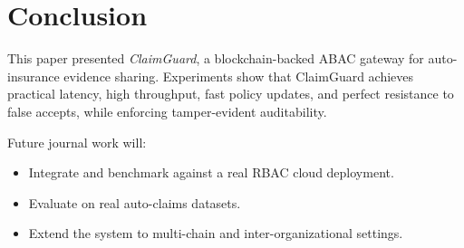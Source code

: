 \documentclass[conference]{IEEEtran}
\begin{document}
\section{Conclusion}

This paper presented \emph{ClaimGuard}, a blockchain-backed ABAC gateway for auto-insurance evidence sharing. Experiments show that ClaimGuard achieves practical latency, high throughput, fast policy updates, and perfect resistance to false accepts, while enforcing tamper-evident auditability.

Future journal work will:
\begin{itemize}
    \item Integrate and benchmark against a real RBAC cloud deployment.
    \item Evaluate on real auto-claims datasets.
    \item Extend the system to multi-chain and inter-organizational settings.
\end{itemize}

\balance


\end{document}

